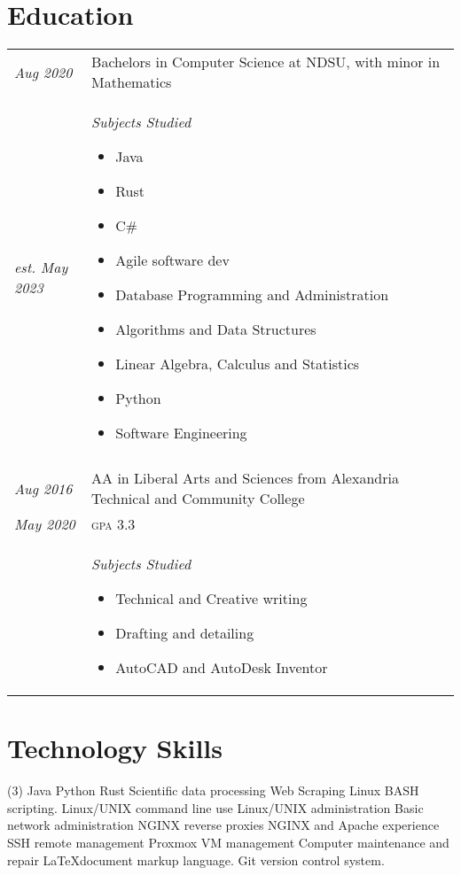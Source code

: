 \documentclass[letterpaper,10pt]{article}
\begin{document}
\section*{Education}
	\begin{tabular}{R{2cm}|p{14cm}}
	\textsl{Aug 2020} & Bachelors in Computer Science at NDSU, with minor in Mathematics\\
	\textsl{est. May 2023} & \textsl{Subjects Studied}
	\begin{itemize}[noitemsep]
		\item Java
		\item Rust
		\item C\#
		\item Agile software dev
		\item Database Programming and Administration
		\item Algorithms and Data Structures
		\item Linear Algebra, Calculus and Statistics
		\item Python
		\item Software Engineering
	\end{itemize}\\
	\\
	\textsl{Aug 2016} & AA in Liberal Arts and Sciences from Alexandria Technical and Community College\\
	\textsl{May 2020} & \textsc{gpa} 3.3\\
	&\textsl{Subjects Studied}
	\begin{itemize}[noitemsep]
		\item Technical and Creative writing
		\item Drafting and detailing
		\item AutoCAD and AutoDesk Inventor
	\end{itemize}
	\end{tabular}
\newpage
\section*{Technology Skills}
	\begin{tasks}[style=itemize](3)
	\task Java
	\task Python
	\task Rust
	\task Scientific data processing
	\task Web Scraping
	\task Linux BASH scripting.
	\task Linux/UNIX command line use
	\task Linux/UNIX administration
	\task Basic network administration
	\task NGINX reverse proxies
	\task NGINX and Apache experience
	\task SSH remote management
	\task Proxmox VM management
	\task Computer maintenance and repair
	\task \LaTeX document markup language.
	\task Git version control system.
	\end{tasks}
\end{document}
